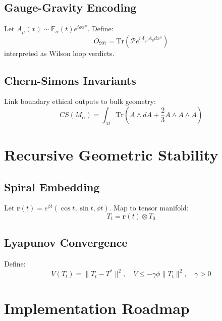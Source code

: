 \documentclass[11pt]{article}
\begin{document}
\subsection{Gauge-Gravity Encoding}
Let $A_\mu(x) \sim \mathbb{E}_\alpha(t) e^{i\phi x^\mu}$. Define:
\begin{equation}
O_{997} = \text{Tr} \left( \mathcal{P} e^{i \oint_\Gamma A_\mu dx^\mu} \right)
\end{equation}
interpreted as Wilson loop verdicts.

\subsection{Chern-Simons Invariants}
Link boundary ethical outputs to bulk geometry:
\begin{equation}
CS(M_\alpha) = \int_M \text{Tr}\left( A \wedge dA + \frac{2}{3} A \wedge A \wedge A \right)
\end{equation}

\section{Recursive Geometric Stability}

\subsection{Spiral Embedding}
Let $\mathbf{r}(t) = e^{\phi t} (\cos t, \sin t, \phi t)$. Map to tensor manifold:
\begin{equation}
T_t = \mathbf{r}(t) \otimes T_0
\end{equation}

\subsection{Lyapunov Convergence}
Define:
\begin{equation}
V(T_t) = \| T_t - T^* \|^2, \quad \dot{V} \leq -\gamma \phi \| T_t \|^2, \quad \gamma > 0
\end{equation}

\section{Implementation Roadmap}
\end{document}
